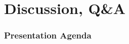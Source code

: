 \section{Discussion, Q\&A}
\begin{frame}
\frametitle{Presentation Agenda}
\tableofcontents[currentsection]
\end{frame}
